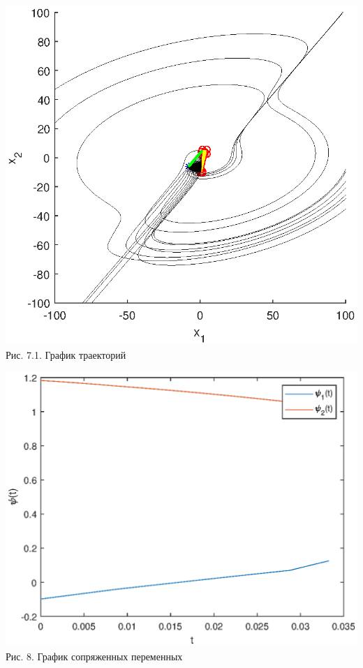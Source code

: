 \documentclass{article}
\theoremstyle{definition}
\begin{document}
\begin{center}
{\includegraphics[width=15cm]{example33.eps}}
{Рис. 7.1. График траекторий}
\end{center}

\begin{center}
{\includegraphics[width=15cm]{pexample3.eps}}
{Рис. 8. График сопряженных переменных}
\end{center}
\end{document}
